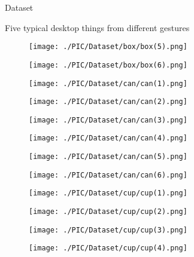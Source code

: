 \documentclass[xcolor=table,compress,blue]{beamer}
\begin{document}
\begin{frame}{Dataset}
\begin{exampleblock}{Five typical desktop things from different gestures}
\begin{figure}[htpb]
\begin{minipage}[b]{0.65in}
			\end{minipage}
			\begin{minipage}[b]{0.65in}
				\centerline{ \texttt{[image: ./PIC/Dataset/box/box(5).png]} }
			\end{minipage}
			\begin{minipage}[b]{0.65in}
				\centerline{ \texttt{[image: ./PIC/Dataset/box/box(6).png]} }
			\end{minipage}
			\begin{minipage}[b]{0.65in}
				\centerline{ \texttt{[image: ./PIC/Dataset/can/can(1).png]} }
			\end{minipage}
			\begin{minipage}[b]{0.65in}
				\centerline{ \texttt{[image: ./PIC/Dataset/can/can(2).png]} }
			\end{minipage}
			\begin{minipage}[b]{0.65in}
				\centerline{ \texttt{[image: ./PIC/Dataset/can/can(3).png]} }
			\end{minipage}
			\begin{minipage}[b]{0.65in}
				\centerline{ \texttt{[image: ./PIC/Dataset/can/can(4).png]} }
			\end{minipage}
			\begin{minipage}[b]{0.65in}
				\centerline{ \texttt{[image: ./PIC/Dataset/can/can(5).png]} }
			\end{minipage}
			\begin{minipage}[b]{0.65in}
				\centerline{ \texttt{[image: ./PIC/Dataset/can/can(6).png]} }
			\end{minipage}
			\begin{minipage}[b]{0.65in}
				\centerline{ \texttt{[image: ./PIC/Dataset/cup/cup(1).png]} }
			\end{minipage}
			\begin{minipage}[b]{0.65in}
				\centerline{ \texttt{[image: ./PIC/Dataset/cup/cup(2).png]} }
			\end{minipage}
			\begin{minipage}[b]{0.65in}
				\centerline{ \texttt{[image: ./PIC/Dataset/cup/cup(3).png]} }
			\end{minipage}
			\begin{minipage}[b]{0.65in}
				\centerline{ \texttt{[image: ./PIC/Dataset/cup/cup(4).png]} }

\end{minipage}
\end{figure}
\end{exampleblock}
\end{frame}
\end{document}
